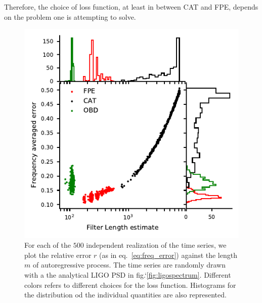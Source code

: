 \documentclass{aa}
\begin{document}
Therefore, the choice of loss function, at least in between CAT and FPE, depends on the problem one is attempting to solve.
\begin{figure}
    \centering
    \includegraphics[width = \linewidth]{Images/optimisers_comparison/ligo/error_length_contour.pdf}
    \caption{For each of the $500$ independent realization of the time series, we plot the relative error $r$ (as in eq.~\eqref{eq:freq_error}) against the length $m$ of autoregressive process. The time series are randomly drawn with a the analytical LIGO PSD in fig.`\ref{fig:ligospectrum}. Different colors refers to different choices for the loss function. Histograms for the distribution od the individual quantities are also represented.}
    \label{fig:LigoOrderError}
\end{figure}
\end{document}
